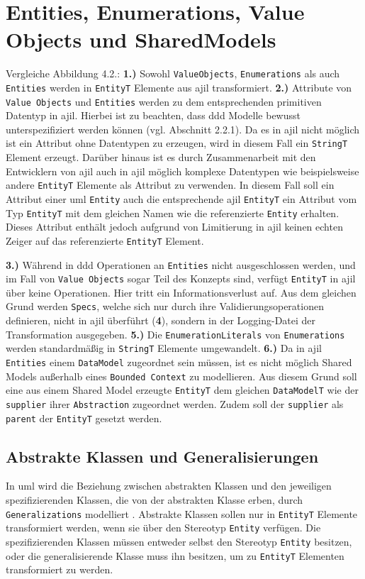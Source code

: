 \documentclass[
	oneside,  %
	ngerman, 
	final, 
	11pt, 
	a4paper, 
	1.1headlines, 
	headinclude=false, 
	footinclude=false, 
	mpinclude=false, 
	pagesize, 
	onecolumn, 
	titlepage, 
	parskip=half, 
	headsepline, 
	chapterprefix=false, 
	version=first, 
	listof=totoc, 
	bibliography=totoc, 
	toc=graduated, 
	fleqn
]{scrbook}
\begin{document}
\section{Entities, Enumerations, Value Objects und SharedModels}
Vergleiche Abbildung 4.2.:
\textbf{1.)} Sowohl \texttt{ValueObjects}, \texttt{Enumerations} als auch \texttt{Entities} werden in \texttt{EntityT} Elemente aus \ac{ajil} transformiert. \textbf{2.)} Attribute von \texttt{Value Objects} und \texttt{Entities} werden zu dem entsprechenden primitiven Datentyp in \ac{ajil}. Hierbei ist zu beachten, dass \ac{ddd} Modelle bewusst unterspezifiziert werden können (vgl. Abschnitt 2.2.1). Da es in \ac{ajil} nicht möglich ist ein Attribut ohne Datentypen zu erzeugen, wird in diesem Fall ein \texttt{StringT} Element erzeugt. Darüber hinaus ist es durch Zusammenarbeit mit den Entwicklern von \ac{ajil} auch in \ac{ajil} möglich komplexe Datentypen wie beispielsweise andere \texttt{EntityT} Elemente als Attribut zu verwenden. In diesem Fall soll ein Attribut einer \ac{uml} \texttt{Entity} auch die entsprechende \ac{ajil} \texttt{EntityT} ein  Attribut vom Typ \texttt{EntityT} mit dem gleichen Namen wie die referenzierte \texttt{Entity} erhalten. Dieses Attribut enthält jedoch aufgrund von Limitierung in \ac{ajil} keinen echten Zeiger auf das referenzierte \texttt{EntityT} Element.

\textbf{3.)} Während in \ac{ddd} Operationen an \texttt{Entities} nicht ausgeschlossen werden, und im Fall von \texttt{Value Objects} sogar Teil des Konzepts sind, verfügt \texttt{EntityT} in \ac{ajil}  über keine Operationen. Hier tritt ein Informationsverlust auf. Aus dem gleichen Grund werden \texttt{Specs}, welche sich nur durch ihre Validierungsoperationen definieren, nicht in \ac{ajil} überführt (\textbf{4}), sondern in der Logging-Datei der Transformation ausgegeben. \textbf{5.)} Die \texttt{EnumerationLiterals} von \texttt{Enumerations} werden standardmäßig in \texttt{StringT} Elemente umgewandelt. \textbf{6.)} Da in \ac{ajil} \texttt{Entities} einem \texttt{DataModel} zugeordnet sein müssen, ist es nicht möglich Shared  Models außerhalb eines \texttt{Bounded Context} zu modellieren. Aus diesem Grund soll eine aus einem Shared Model erzeugte \texttt{EntityT} dem gleichen \texttt{DataModelT} wie der \texttt{supplier} ihrer \texttt{Abstraction} zugeordnet werden. Zudem soll der \texttt{supplier} als \texttt{parent} der \texttt{EntityT} gesetzt werden.
\subsection{Abstrakte Klassen und Generalisierungen}
In \ac{uml} wird die Beziehung zwischen abstrakten Klassen und den jeweiligen spezifizierenden Klassen, die von der abstrakten Klasse erben, durch \texttt{Generalizations} modelliert \cite{UML}. Abstrakte Klassen sollen nur in \texttt{EntityT} Elemente transformiert werden, wenn sie über den Stereotyp \texttt{Entity} verfügen. Die spezifizierenden Klassen müssen entweder selbst den Stereotyp \texttt{Entity} besitzen, oder die generalisierende Klasse muss ihn besitzen, um zu \texttt{EntityT} Elementen transformiert zu werden.
\end{document}
